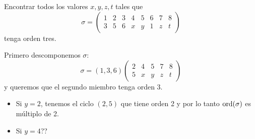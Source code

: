 \begin{ej} %
    Encontrar todos los valores $x, y, z, t$ tales que 
    \[
        \sigma =
        \begin{pmatrix}
            1 & 2 & 3 & 4 & 5 & 6 & 7 & 8 \\
            3 & 5 & 6 & x & y & 1 & z & t
        \end{pmatrix}
    \]
    tenga orden tres.

    Primero descomponemos $\sigma$:
    \[
        \sigma = (1, 3, 6)
        \begin{pmatrix}
            2 & 4 & 5 & 7 & 8 \\
            5 & x & y & z & t
        \end{pmatrix}
    \]
    y queremos que el segundo miembro tenga orden 3.

    \begin{itemize}
        \item Si $y = 2$, tenemos el ciclo $(2, 5)$ que tiene orden 2 y por lo tanto $\operatorname{ord}(\sigma)$
            es m\'ultiplo de 2.
        \item Si $y = 4$??%
    \end{itemize}
\end{ej}
